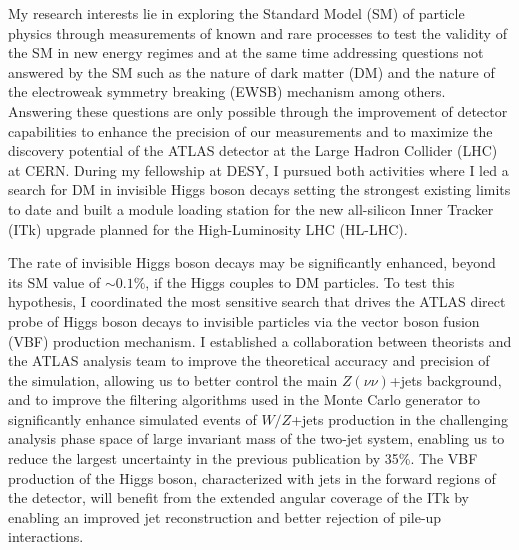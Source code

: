\documentclass[a4paper]{article}
\begin{document}
\thispagestyle{fancy} 
 \lfoot{} \rfoot{\bf \thepage} \cfoot{}

\fontsize{11}{14}
\selectfont


My research interests lie in exploring the Standard Model (SM) of particle physics through measurements of known and rare processes
to test the validity of the SM in new energy regimes and at the same time addressing questions not answered by the SM such as the nature of dark matter (DM) and the nature of the electroweak symmetry breaking (EWSB) mechanism among others.
Answering these questions are only possible through the improvement of detector capabilities to enhance the precision of our measurements and to maximize the discovery potential of the ATLAS detector at the Large Hadron Collider (LHC) at CERN. During my fellowship at DESY, I pursued both activities where I led a search for DM in invisible Higgs boson decays setting the strongest existing limits to date and built a module loading station for the new all-silicon Inner Tracker (ITk) upgrade planned for the High-Luminosity LHC (HL-LHC).


The rate of invisible Higgs boson decays may be significantly enhanced, beyond its SM value of $\sim0.1\%$, if the Higgs couples to DM particles.
To test this hypothesis, I coordinated the most sensitive search that drives the ATLAS direct probe of Higgs boson decays to invisible particles via the vector boson fusion (VBF) production mechanism. I established a collaboration between theorists and the ATLAS analysis team to improve the theoretical accuracy and precision of the simulation, allowing us to better control the main $Z\left(\nu\nu\right)$+jets background,
and to improve the filtering algorithms used in the Monte Carlo generator to significantly enhance simulated events of $W/Z$+jets
production in the challenging analysis phase space of large invariant mass of the two-jet system, enabling us to reduce the largest uncertainty
 in the previous publication by 35\%.
The VBF production of the Higgs boson, characterized with jets in the forward regions of the detector, will benefit from the extended angular coverage of the ITk by enabling an improved jet reconstruction and better rejection of pile-up interactions.
\end{document}

